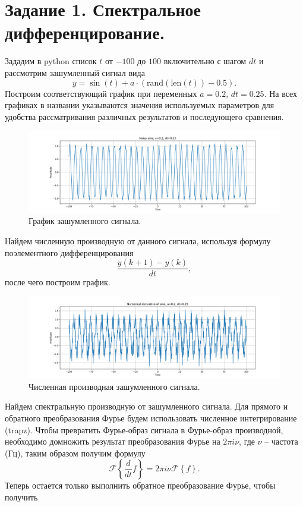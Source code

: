 \documentclass[a4paper, 12pt]{article}
\begin{document}
    \section{Задание 1. Спектральное дифференцирование.}
    Зададим в python список $t$ от $-100$ до $100$ включительно с шагом $dt$ и рассмотрим зашумленный сигнал вида $$y=\sin{(t)}+a\cdot(\text{rand}(\text{len}(t))-0.5).$$
    Построим соответствующий график при переменных $a=0.2,\,dt=0.25$. На всех графиках в названии указываются значения используемых параметров для удобства рассматривания
    различных результатов и последующего сравнения.
    \begin{figure}[H]
        \centering
        \includegraphics[scale=0.4]{1_noisy_sine.png}
        \captionsetup{skip=0pt}
        \caption{График зашумленного сигнала.}
        \label{fig:1ns}
    \end{figure}
    Найдем численную производную от данного сигнала, используя формулу поэлементного дифференцирования $$\dfrac{y(k+1)-y(k)}{dt},$$ после чего построим график.
    \begin{figure}[H]
        \centering
        \includegraphics[scale=0.4]{1_numdiff_sine.png}
        \captionsetup{skip=0pt}
        \caption{Численная производная зашумленного сигнала.}
        \label{fig:1nds}
    \end{figure}
    Найдем спектральную производную от зашумленного сигнала. Для прямого и обратного преобразования Фурье будем использовать численное интегрирование (trapz). Чтобы
    превратить Фурье-образ сигнала в Фурье-образ производной, необходимо домножить результат преобразования Фурье на $2\pi i \nu$, где $\nu$ -- частота (Гц),
    таким образом получим формулу $$\mathcal{F}\left\{\frac{d}{dt}f\right\}=2\pi i \nu \mathcal{F}\left\{f\right\}.$$ Теперь остается только выполнить обратное преобразование Фурье, чтобы получить
\end{document}
